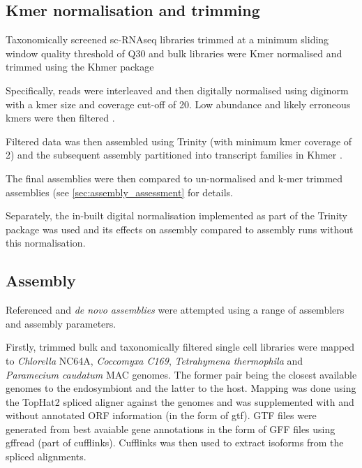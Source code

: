 \subsection{Kmer normalisation and trimming}

Taxonomically screened sc-RNAseq libraries trimmed at a minimum sliding window quality
threshold of Q30 and bulk libraries were Kmer normalised and trimmed using the Khmer package \citep{Crusoe2015}

Specifically, reads were interleaved \citep{Doring2008} and then digitally normalised using diginorm \citep{Brown2012}
with a kmer size and coverage cut-off of 20.  Low abundance and likely erroneous
kmers were then filtered \citep{Zhang2015,Zhang2014}.  

Filtered data was then assembled using Trinity (with minimum kmer coverage of 2) 
and the subsequent assembly partitioned into transcript families in Khmer \citep{Pell2012}.

The final assemblies were then compared to un-normalised and k-mer trimmed assemblies 
(see \ref{sec:assembly_assessment} for details.

Separately, the in-built digital normalisation implemented as part of the Trinity package
was used and its effects on assembly compared to assembly runs without this normalisation.


\subsection{Assembly}

Referenced and \textit{de novo assemblies} were attempted using a range of assemblers
and assembly parameters.

Firstly, trimmed bulk and taxonomically filtered single cell libraries
were mapped to \textit{Chlorella} NC64A, \textit{Coccomyxa C169}, 
\textit{Tetrahymena thermophila} and \textit{Paramecium caudatum} MAC genomes.
The former pair being the closest available genomes to the endosymbiont and the latter to the host.
Mapping was done using the TopHat2 spliced aligner \citep{Kim2013} against
the genomes and was supplemented with and without annotated ORF information (in the form of gtf).
GTF files were generated from best avaiable gene annotations in the form of GFF files using gffread (part of
cufflinks).
Cufflinks \citep{Trapnell2011} was then used to extract isoforms from the spliced alignments.

